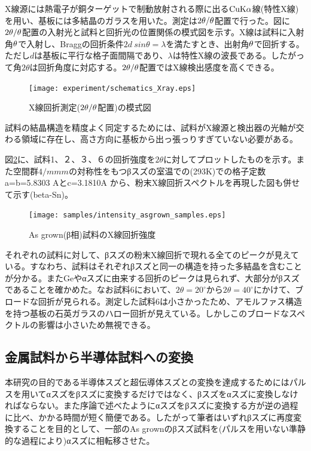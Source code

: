 X線源には熱電子が銅ターゲットで制動放射される際に出る$\rm CuK\alpha$線(特性X線)を用い、基板には多結晶のガラスを用いた。測定は$\rm 2\theta/\theta$配置で行った。図に$\rm 2\theta/\theta$配置の入射光と試料と回折光の位置関係の模式図を示す。X線は試料に入射角$\rm \theta$で入射し、Braggの回折条件$2d\:sin\theta=\lambda$を満たすとき、出射角$\rm \theta$で回折する。ただし$d$は基板に平行な格子面間隔であり、$\lambda$は特性X線の波長である。したがって角$2\theta$は回折角度に対応する。$\rm 2\theta/\theta$配置ではX線検出感度を高くできる。
\begin{figure}[!h]
    \begin{center}
   \texttt{[image: experiment/schematics\_Xray.eps]}
  \end{center}
  \caption{X線回折測定($\rm 2\theta/\theta$配置)の模式図}
  \label{fig:schematics_Xray}
\end{figure}

試料の結晶構造を精度よく同定するためには、試料がX線源と検出器の光軸が交わる領域に存在し、高さ方向に基板から出っ張っりすぎていない必要がある。

図\ref{fig:intensity_asgrown_samples}に、試料1、２、３、６の回折強度を$2\theta$に対してプロットしたものを示す。また空間群$4/mmm$の対称性をもつβスズの室温での(293K)での格子定数a=b=5.8303 Aとc=3.1810A \cite{Wolcyrz}から、粉末X線回折スペクトルを再現した図も併せて示す(beta-Sn)。
\begin{figure}[!h]
    \begin{center}
   \texttt{[image: samples/intensity\_asgrown\_samples.eps]}
  \end{center}
  \caption{As grown(β相)試料のX線回折強度}
  \label{fig:intensity_asgrown_samples}
\end{figure}

それぞれの試料に対して、βスズの粉末X線回折で現れる全てのピークが見えている。すなわち、試料はそれぞれβスズと同一の構造を持った多結晶を含むことが分かる。またGeやαスズに由来する回折のピークは見られず、大部分がβスズであることを確かめた。なお試料6において、$2\theta=20^\circ$から$2\theta=40^\circ$にかけて、ブロードな回折が見られる。測定した試料6は小さかったため、アモルファス構造を持つ基板の石英ガラスのハロー回折\cite{Speakman}が見えている。しかしこのブロードなスペクトルの影響は小さいため無視できる。

\subsection{金属試料から半導体試料への変換}
本研究の目的である半導体スズと超伝導体スズとの変換を達成するためにはパルスを用いてαスズをβスズに変換するだけではなく、βスズをαスズに変換しなければならない。また序論で述べたようにαスズをβスズに変換する方が逆の過程に比べ、かかる時間が短く簡便である。したがって筆者はいずれβスズに再度変換することを目的として、一部のAs grownのβスズ試料を(パルスを用いない準静的な過程により)αスズに相転移させた。

